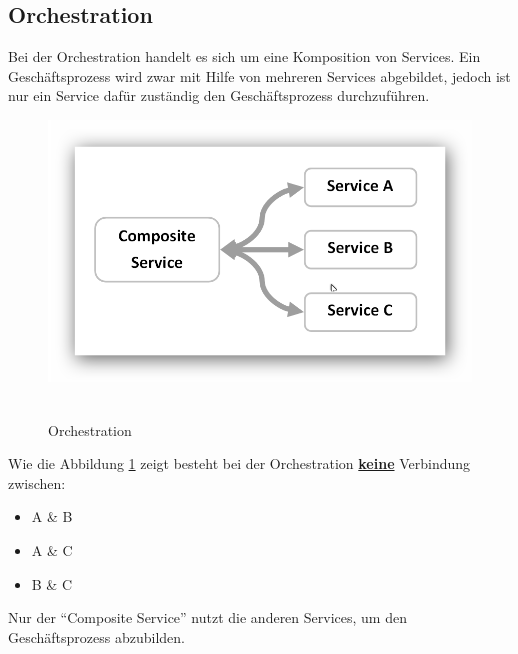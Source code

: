 \subsection*{Orchestration}
\label{subsec:orchestration}
Bei der Orchestration handelt es sich um eine Komposition von Services. Ein Geschäftsprozess wird zwar mit Hilfe von mehreren Services abgebildet, jedoch ist nur ein Service dafür zuständig den Geschäftsprozess durchzuführen.
\newpage
\begin{figure}[htb]
    \centering 
    \includegraphics[width=\linewidth]{content/images/ServiceOrchestration}\
    \caption[Orchestration]{Orchestration}
    \label{fig:ServiceOrchestration}  
\end{figure}

Wie die Abbildung \ref{fig:ServiceOrchestration} zeigt besteht bei der Orchestration \textbf{\underline{keine}} Verbindung zwischen:
\begin{itemize}
    \item A \& B
    \item A \& C
    \item B \& C
\end{itemize}
Nur der "`Composite Service"' nutzt die anderen Services, um den Geschäftsprozess abzubilden.
        
